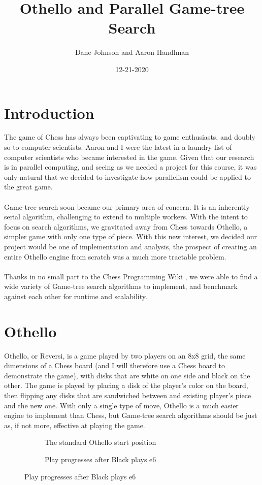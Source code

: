 \documentclass[]{article}
\author{Dane Johnson and Aaron Handlman}
\date{12-21-2020}
\title{Othello and Parallel Game-tree Search}
\begin{document}
\maketitle

\section{Introduction}
The game of Chess has always been captivating to game enthusiasts, and doubly so to computer scientists.
Aaron and I were the latest in a laundry list of computer scientists who became interested in the game.
Given that our research is in parallel computing, and seeing as we needed a project for this course, it
was only natural that we decided to investigate how parallelism could be applied to the great game.
\\ \\
Game-tree search soon became our primary area of concern. It is an inherently serial algorithm,
challenging to extend to multiple workers. With the intent to focus on search algorithms, we gravitated
away from Chess towards Othello, a simpler game with only one type of piece. With this new interest,
we decided our project would be one of implementation and analysis, the prospect of creating an entire
Othello engine from scratch was a much more tractable problem.
\\ \\
Thanks in no small part to the Chess Programming Wiki \cite{cpw}, we were able to find a wide variety
of Game-tree search algorithms to implement, and benchmark against each other for runtime and
scalability.
\section{Othello}
Othello, or Reversi, is a game played by two players on an 8x8 grid, the same dimensions
of a Chess board (and I will therefore use a Chess board to demonstrate the game), with disks that
are white on one side and black on the other.
The game is played by placing a disk of the player's color on the board, then flipping
any disks that are sandwiched between and existing player's piece and the new one.
With only a single type of move, Othello is a much easier engine to implement than Chess, but Game-tree
search algorithms should be just as, if not more, effective at playing the game.
\begin{figure}[t]
\begin{subfigure}[b]{0.5\textwidth}
  \caption{The standard Othello start position}
  \newgame
{}
\showboard
\end{subfigure}
\begin{subfigure}[b]{0.5\textwidth}
  \caption{Play progresses after Black plays e6}
  \newgame
{}
\showboard
\end{subfigure}
\end{figure}
\end{document}
